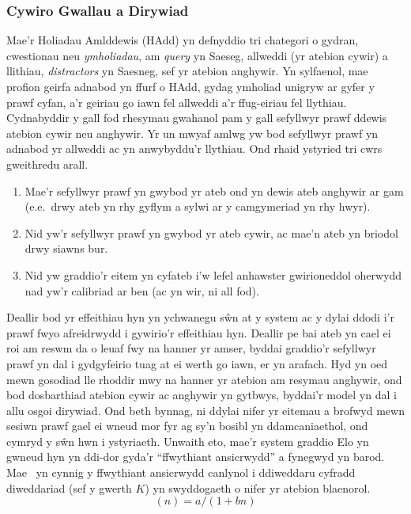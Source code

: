 \subsubsection{Cywiro Gwallau a Dirywiad}
Mae'r Holiadau Amlddewis (HAdd) yn defnyddio tri chategori o gydran, cwestionau neu \textit{ymholiadau}, am \textit{query} yn Saeseg, allweddi (yr atebion cywir) a llithiau, \textit{distractors} yn Saesneg, sef yr atebion anghywir. Yn sylfaenol, mae profion geirfa adnabod yn ffurf o HAdd, gydag ymholiad unigryw ar gyfer y prawf cyfan, a'r geiriau go iawn fel allweddi a'r ffug-eiriau fel llythiau. Cydnabyddir y gall fod rhesymau gwahanol pam y gall sefyllwyr prawf ddewis atebion cywir neu anghywir. Yr un mwyaf amlwg yw bod sefyllwyr prawf yn adnabod yr allweddi ac yn anwybyddu'r llythiau. Ond rhaid ystyried tri cwrs gweithredu arall.
\begin{enumerate}
    \item Mae'r sefyllwyr prawf yn gwybod yr ateb ond yn dewis ateb anghywir ar gam (e.e.\ drwy ateb yn rhy gyflym a sylwi ar y camgymeriad yn rhy hwyr).
    \item Nid yw'r sefyllwyr prawf yn gwybod yr ateb cywir, ac mae'n ateb yn briodol drwy siawns bur.
    \item Nid yw graddio'r eitem yn cyfateb i'w lefel anhawster gwirioneddol oherwydd nad yw'r calibriad ar ben (ac yn wir, ni all fod).
\end{enumerate}
Deallir bod yr effeithiau hyn yn ychwanegu sŵn at y system ac y dylai ddodi i'r prawf fwyo  afreidrwydd i gywirio'r effeithiau hyn. Deallir pe bai ateb yn cael ei roi am reswm da o leuaf fwy na hanner yr amser, byddai graddio'r sefyllwyr prawf yn dal i gydgyfeirio tuag at ei werth go iawn, er yn arafach. Hyd yn oed mewn gosodiad lle rhoddir mwy na hanner yr atebion am resymau anghywir, ond bod dosbarthiad atebion cywir ac anghywir yn gytbwys, byddai'r model yn dal i allu osgoi dirywiad. Ond beth bynnag, ni ddylai nifer yr eitemau a brofwyd mewn sesiwn prawf gael ei wneud mor fyr ag sy'n bosibl yn ddamcaniaethol, ond cymryd y sŵn hwn i ystyriaeth. Unwaith eto, mae'r system graddio Elo yn gwneud hyn yn ddi-dor gyda'r ``ffwythiant ansicrwydd'' a fynegwyd yn barod. Mae~\cite{pelanek_applications_2016} yn cynnig y ffwythiant ansicrwydd canlynol i ddiweddaru cyfradd diweddariad (sef y gwerth $K$) yn swyddogaeth o nifer yr atebion blaenorol.
\begin{equation}
    (n)=a/(1 + bn)\label{eq:uncertainty-function}
\end{equation}

